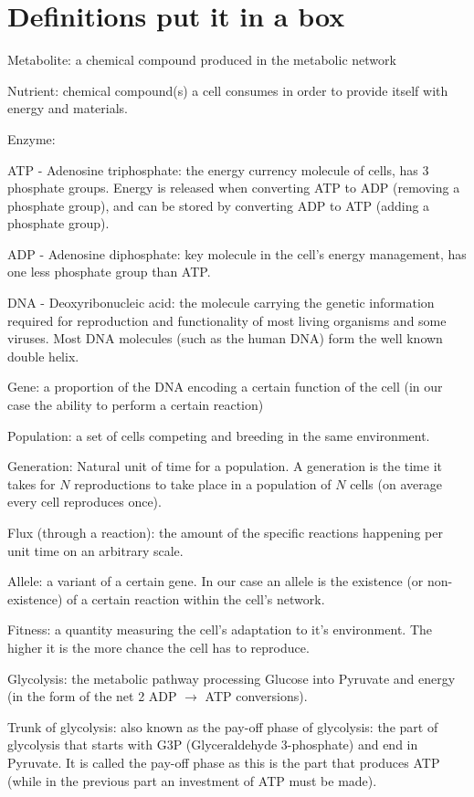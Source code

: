 \documentclass[10pt,a4paper]{article}
\begin{document}
	\section*{Definitions put it in a box}

	\begin{framed}

	Metabolite: a chemical compound produced in the metabolic network

	Nutrient: chemical compound(s) a cell consumes in order to provide itself with energy and materials.

	Enzyme:

	ATP - Adenosine triphosphate: the energy currency molecule of cells, has 3 phosphate groups. Energy is released when converting ATP to ADP (removing a phosphate group), and can be stored by converting ADP to ATP (adding a phosphate group).

	ADP - Adenosine diphosphate: key molecule in the cell's energy management, has one less phosphate group than ATP.

	DNA - Deoxyribonucleic acid: the molecule carrying the genetic information required for reproduction and functionality of most living organisms and some viruses. Most DNA molecules (such as the human DNA) form the well known double helix. 

	Gene: a proportion of the DNA encoding a certain function of the cell (in our case the ability to perform a certain reaction)

	Population: a set of cells competing and breeding in the same environment.

	Generation: Natural unit of time for a population. A generation is the time it takes for $N$ reproductions to take place in a population of $N$ cells (on average every cell reproduces once).

	Flux (through a reaction): the amount of the specific reactions happening per unit time on an arbitrary scale. 

	Allele: a variant of a certain gene. In our case an allele is the existence (or non-existence) of a certain reaction within the cell's network.

	Fitness: a quantity measuring the cell's adaptation to it's environment. The higher it is the more chance the cell has to reproduce.

	Glycolysis: the metabolic pathway processing Glucose into Pyruvate and energy (in the form of the net 2 ADP $\rightarrow$ ATP conversions).

	Trunk of glycolysis: also known as the pay-off phase of glycolysis: the part of glycolysis that starts with G3P (Glyceraldehyde 3-phosphate) and end in Pyruvate. It is called the pay-off phase as this is the part that produces ATP (while in the previous part an investment of ATP must be made).

	\end{framed}
\end{document}
